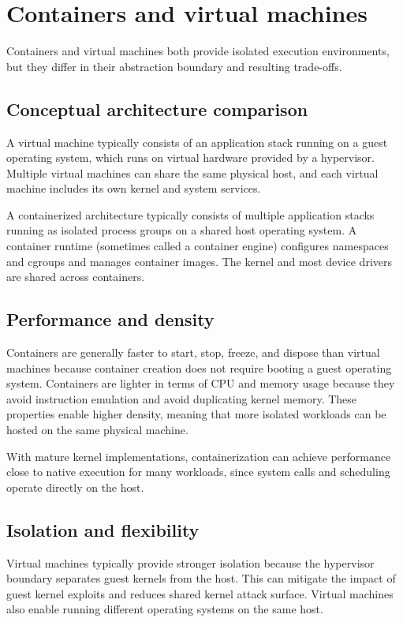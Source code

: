 \documentclass[11pt,a4paper,openany]{report}
\begin{document}
\section{Containers and virtual machines}

Containers and virtual machines both provide isolated execution environments, but they differ in their abstraction boundary and resulting trade-offs.

\subsection{Conceptual architecture comparison}

A virtual machine typically consists of an application stack running on a guest operating system, which runs on virtual hardware provided by a hypervisor. Multiple virtual machines can share the same physical host, and each virtual machine includes its own kernel and system services.

A containerized architecture typically consists of multiple application stacks running as isolated process groups on a shared host operating system. A container runtime (sometimes called a container engine) configures namespaces and cgroups and manages container images. The kernel and most device drivers are shared across containers.

\subsection{Performance and density}

Containers are generally faster to start, stop, freeze, and dispose than virtual machines because container creation does not require booting a guest operating system. Containers are lighter in terms of CPU and memory usage because they avoid instruction emulation and avoid duplicating kernel memory. These properties enable higher density, meaning that more isolated workloads can be hosted on the same physical machine.

With mature kernel implementations, containerization can achieve performance close to native execution for many workloads, since system calls and scheduling operate directly on the host.

\subsection{Isolation and flexibility}

Virtual machines typically provide stronger isolation because the hypervisor boundary separates guest kernels from the host. This can mitigate the impact of guest kernel exploits and reduces shared kernel attack surface. Virtual machines also enable running different operating systems on the same host.
\end{document}
